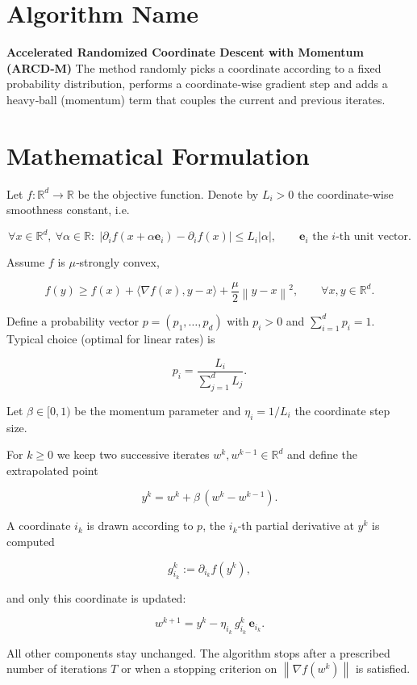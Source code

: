 \documentclass{article}
\newcommand{\R}{\mathbb{R}}
\newcommand{\norm}[1]{\left\| #1\right\|}
\newcommand{\ip}[2]{\langle #1,#2\rangle}
\newcommand{\grad}{\nabla}
\newcommand{\be}{\mathbf{e}}
\begin{document}
\section*{Algorithm Name}
\textbf{Accelerated Randomized Coordinate Descent with Momentum (ARCD‑M)}  
The method randomly picks a coordinate according to a fixed probability
distribution, performs a coordinate‑wise gradient step and adds a heavy‑ball
(momentum) term that couples the current and previous iterates.

\section*{Mathematical Formulation}
Let $f:\R^{d}\rightarrow\R$ be the objective function.
Denote by $L_{i}>0$ the coordinate‑wise smoothness constant, i.e.

\[
\forall x\in\R^{d},\ \forall \alpha\in\R:\;
\bigl|\partial_{i}f(x+\alpha \be_{i})-\partial_{i}f(x)\bigr|\le L_{i}|\alpha|,
\qquad\be_{i}\text{ the $i$‑th unit vector.}
\tag{1}
\]

Assume $f$ is $\mu$‑strongly convex,

\[
f(y)\ge f(x)+\ip{\grad f(x)}{y-x}+\frac{\mu}{2}\norm{y-x}^{2},
\qquad\forall x,y\in\R^{d}.
\tag{2}
\]

Define a probability vector $p=(p_{1},\dots ,p_{d})$ with $p_{i}>0$ and
$\sum_{i=1}^{d}p_{i}=1$.  
Typical choice (optimal for linear rates) is  

\[
p_{i}= \frac{L_{i}}{\sum_{j=1}^{d}L_{j}} .
\tag{3}
\]

Let $\beta\in[0,1)$ be the momentum parameter and $\eta_{i}=1/L_{i}$ the
coordinate step size.

\medskip
For $k\ge0$ we keep two successive iterates $w^{k},w^{k-1}\in\R^{d}$ and
define the extrapolated point

\[
y^{k}=w^{k}+ \beta\,(w^{k}-w^{k-1}).                                         
\tag{4}
\]

A coordinate $i_{k}$ is drawn according to $p$,
the $i_{k}$‑th partial derivative at $y^{k}$ is computed

\[
g^{k}_{i_{k}}:=\partial_{i_{k}}f(y^{k}),
\tag{5}
\]

and only this coordinate is updated:

\[
w^{k+1}=y^{k}-\eta_{i_{k}}\,g^{k}_{i_{k}}\,\be_{i_{k}} .
\tag{6}
\]

All other components stay unchanged.  
The algorithm stops after a prescribed number of iterations $T$ or when a
stopping criterion on $\norm{\grad f(w^{k})}$ is satisfied.
\end{document}
